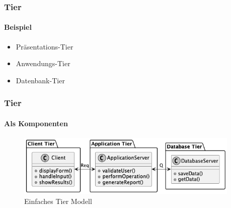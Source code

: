 \begin{frame}
  \frametitle{Tier}
  \framesubtitle{Beispiel}
  \begin{itemize}
    \item Präsentations-Tier
    \item Anwendungs-Tier 
    \item Datenbank-Tier
  \end{itemize}
\end{frame}

\begin{frame}
  \frametitle{Tier}
  \framesubtitle{Als Komponenten}

  \begin{figure}[!h]
    \centering
    \includegraphics[width=0.95\textwidth]{fig/uml/simple-tiers.png}
    \caption{Einfaches Tier Modell}
    \label{fig:simple-tier}
  \end{figure}
\end{frame}
